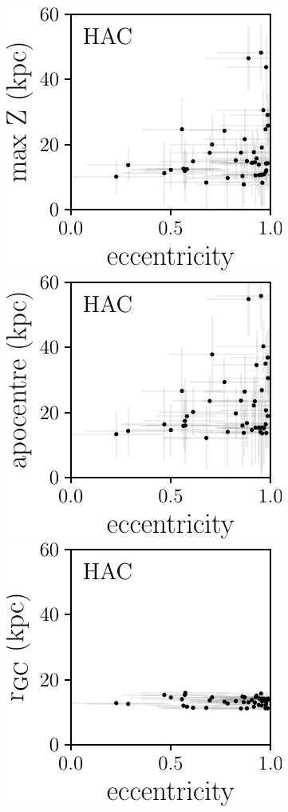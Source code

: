 \documentclass[a4paper,useAMS,usenatbib]{mnras}
\begin{document}
%
\begin{figure}
	\includegraphics[scale=0.473]{HAC_orbits_ecc_z.pdf}
    \includegraphics[scale=0.473]{HAC_orbits_apo_ecc.pdf} 
  \includegraphics[scale=0.473]{HAC_orbits_ecc_r.pdf} 

\end{figure}
\end{document}

